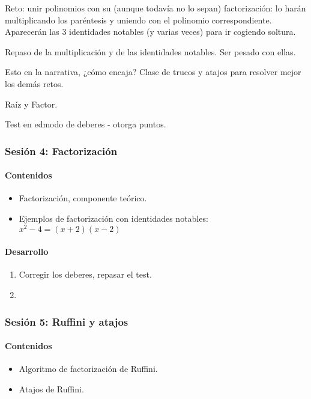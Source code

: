 Reto: unir polinomios con su (aunque todavía no lo sepan) factorización: lo harán multiplicando los paréntesis y uniendo con el polinomio correspondiente.
%
Aparecerán las 3 identidades notables (y varias veces) para ir cogiendo soltura.

Repaso de la multiplicación y de las identidades notables. 
%
Ser pesado con ellas.

Esto en la narrativa, ¿cómo encaja?
%
Clase de trucos y atajos para resolver mejor los demás retos.

Raíz y Factor.

Test en edmodo de deberes - otorga puntos.


\subsubsection{Sesión 4: Factorización}


\paragraph{Contenidos}
\begin{itemize}
	\item Factorización, componente teórico.
	\item Ejemplos de factorización con identidades notables: $x^2-4 = (x+2)(x-2)$
\end{itemize}

\paragraph{Desarrollo}
\begin{enumerate}
	\item Corregir los deberes, repasar el test.
	\item 
\end{enumerate}

\subsubsection{Sesión 5: Ruffini y atajos}

\paragraph{Contenidos}
\begin{itemize}
	\item Algoritmo de factorización de Ruffini.
	\item Atajos de Ruffini.
\end{itemize}

